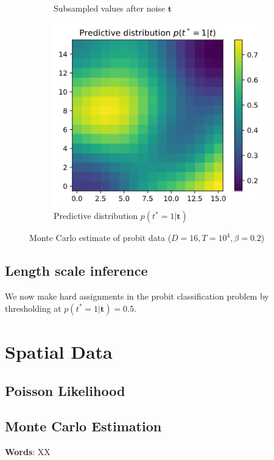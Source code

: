 \documentclass[]{article}
\newcommand{\tbold}{\boldsymbol{t}}
\begin{document}
\begin{figure}[!h]
\begin{subfigure}{0.32\linewidth}
		\caption{Subsampled values after noise $\tbold$}
		\label{fig:t-2d}
	\end{subfigure}
	\begin{subfigure}{0.32\linewidth}
		\includegraphics[width=\linewidth]{t-predictive.png}
		\caption{Predictive distribution $p(t^* = 1 | \tbold)$}
		\label{fig:t-predictive}
	\end{subfigure}
	\caption{Monte Carlo estimate of probit data ($D=16, T=10^4, \beta=0.2$)}
	\label{fig:t-estimate}
\end{figure}

\subsection{Length scale inference}

We now make hard assignments in the probit classification problem by thresholding at $p(t^*=1 | \tbold) = 0.5$.
\section{Spatial Data}

\subsection{Poisson Likelihood}

\subsection{Monte Carlo Estimation}

\textbf{Words}: XX
\end{document}
